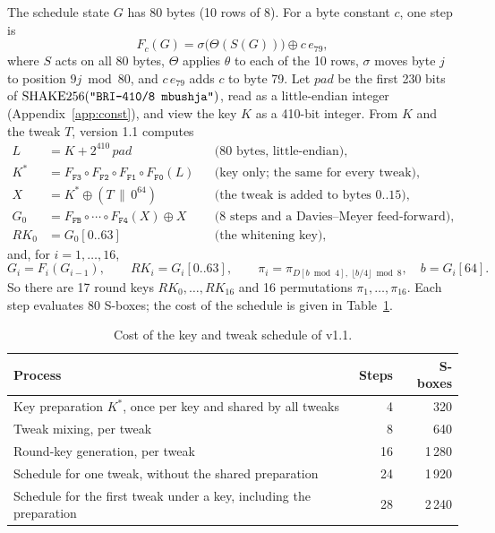 \documentclass[11pt,a4paper]{article}
\newcommand{\RK}{\mathit{RK}}
\newcommand{\shake}{\mathrm{SHAKE256}}
\newcommand{\str}[1]{\text{\texttt{"#1"}}}
\newcommand{\hx}[1]{\mathtt{#1}}
\begin{document}
The schedule state $G$ has 80 bytes (10 rows of 8). For a byte constant $c$, one step is
\[
  F_c(G) = \sigma\bigl(\Theta(S(G))\bigr) \oplus c\, e_{79},
\]
where $S$ acts on all 80 bytes, $\Theta$ applies $\theta$ to each of the 10 rows, $\sigma$ moves byte $j$ to
position $9j \bmod 80$, and $c\,e_{79}$ adds $c$ to byte 79. Let $\mathit{pad}$ be the first 230 bits of
$\shake(\str{BRI-410/8 mbushja})$, read as a little-endian integer (Appendix~\ref{app:const}), and view the key
$K$ as a 410-bit integer. From $K$ and the tweak $T$, version 1.1 computes
\begin{align*}
  L &= K + 2^{410}\,\mathit{pad} &&\text{(80 bytes, little-endian)},\\
  K^* &= F_{\hx{F3}} \circ F_{\hx{F2}} \circ F_{\hx{F1}} \circ F_{\hx{F0}}(L)
      &&\text{(key only; the same for every tweak)},\\
  X &= K^* \oplus (T \,\|\, 0^{64}) &&\text{(the tweak is added to bytes } 0..15),\\
  G_0 &= F_{\hx{FB}} \circ \cdots \circ F_{\hx{F4}}(X) \oplus X &&\text{(8 steps and a Davies--Meyer feed-forward)},\\
  \RK_0 &= G_0[0..63] &&\text{(the whitening key)},
\end{align*}
and, for $i = 1,\dots,16$,
\[
  G_i = F_i(G_{i-1}), \qquad \RK_i = G_i[0..63], \qquad
  \pi_i = \pi_{D[b \bmod 4],\; \lfloor b/4\rfloor \bmod 8}, \quad b = G_i[64].
\]
So there are 17 round keys $\RK_0,\dots,\RK_{16}$ and 16 permutations $\pi_1,\dots,\pi_{16}$. Each step
evaluates 80 S-boxes; the cost of the schedule is given in Table~\ref{tab:cost}.

\begin{table}[ht]
\centering\small
\begin{tabular}{@{}lrr@{}}
\toprule
Process & Steps & S-boxes\\
\midrule
Key preparation $K^*$, once per key and shared by all tweaks & 4 & 320\\
Tweak mixing, per tweak & 8 & 640\\
Round-key generation, per tweak & 16 & 1\,280\\
Schedule for one tweak, without the shared preparation & 24 & 1\,920\\
Schedule for the first tweak under a key, including the preparation & 28 & 2\,240\\
\bottomrule
\end{tabular}
\caption{Cost of the key and tweak schedule of v1.1.}\label{tab:cost}
\end{table}
\end{document}
